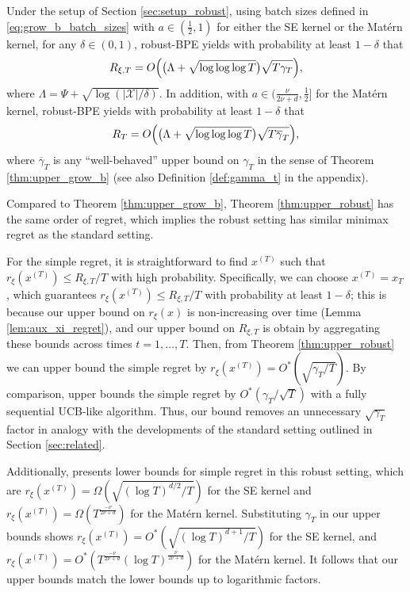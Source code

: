 \documentclass[10pt]{article}
\begin{document}
\begin{theorem}
    \label{thm:upper_robust}
    Under the setup of Section \ref{sec:setup_robust},
    using batch sizes defined in \eqref{eq:grow_b_batch_sizes} with $a\in(\frac{1}{2},1)$ for either the SE kernel or the Mat\'ern kernel,
    for any $\delta \in (0,1)$,
    robust-BPE yields with probability at least $1-\delta$ that
    \begin{align*}
    	R_{\xi,T}
        = O \Bigl(\bigl(\Lambda + \sqrt{\log \log\log T}\bigr)\sqrt{T\gamma_T}\Bigr),
    \end{align*}
    where $\Lambda=\Psi+\sqrt{\log(|\mathcal{X}|/\delta)}$.
    In addition, 
    with $a\in(\frac{\nu}{2\nu+d},\frac{1}{2}]$ for the Mat\'ern kernel,
    robust-BPE yields with probability at least $1-\delta$ that
    \begin{align*}
    	R_T
        = O \Bigl(\bigl(\Lambda + \sqrt{\log \log\log T}\bigr)\sqrt{T\overline{\gamma}_T}\Bigr),
    \end{align*}
    where $\overline{\gamma}_T$ is any ``well-behaved'' upper bound on $\gamma_T$ in the sense of Theorem \ref{thm:upper_grow_b} (see also Definition \ref{def:gamma_t} in the appendix).
\end{theorem}
\begin{remark}
    Compared to Theorem \ref{thm:upper_grow_b}, Theorem \ref{thm:upper_robust} has the same order of regret, which implies the robust setting has similar minimax regret as the standard setting.
\end{remark}
\begin{remark}
    \label{rmk:robust_simple_regret}
    For the simple regret, it is straightforward to find $x^{(T)}$ such that $r_{\xi}(x^{(T)}) \leq R_{\xi,T}/T$ with high probability. Specifically, we can choose $x^{(T)} = x_T$,
    which guarantees $r_{\xi}(x^{(T)}) \leq R_{\xi,T}/T $ with probability at least $1-\delta$;
    this is because our upper bound on $r_{\xi}(x)$ is non-increasing over time (Lemma \ref{lem:aux_xi_regret}), and our upper bound on $R_{\xi,T}$ is obtain by aggregating these bounds across times $t=1,\ldots, T$.
    Then, from Theorem \ref{thm:upper_robust} we can upper bound the simple regret by $r_{\xi}(x^{(T)})=O^*(\sqrt{\gamma_T/T})$.
    By comparison, \citep{Bogunovic18} upper bounds the simple regret by $O^*(\gamma_T/\sqrt{T})$ with a fully sequential UCB-like algorithm.
    Thus, our bound removes an unnecessary $\sqrt{\gamma_T}$ factor in analogy with the developments of the standard setting outlined in Section \ref{sec:related}. 
\end{remark}
\begin{remark}
    Additionally, \citep{Cai21} presents lower bounds for simple regret in this robust setting, which are $r_{\xi}(x^{(T)}) = \Omega(\sqrt{(\log T)^{d/2}/T})$ for the SE kernel and $r_{\xi}(x^{(T)}) = \Omega(T^{\frac{-\nu}{2\nu+d}})$ for the Mat\'ern kernel. Substituting $\gamma_T$ in our upper bounds shows $r_{\xi}(x^{(T)}) = O^*(\sqrt{(\log T)^{d+1}/T})$ for the SE kernel, and $r_{\xi}(x^{(T)}) = O^*(T^{\frac{-\nu}{2\nu+d}}(\log T)^{\frac{\nu}{2\nu+d}})$ for the Mat\'ern kernel. It follows that our upper bounds match the lower bounds up to logarithmic factors.
\end{remark}
\end{document}
